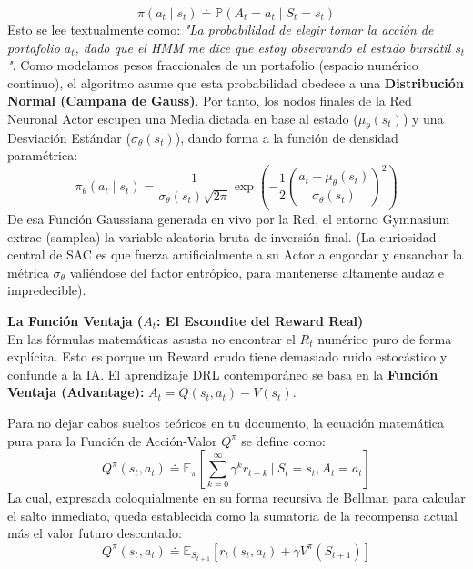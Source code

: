 \documentclass[11pt]{article}
\begin{document}
\begin{itemize}
    \begin{equation}
        \pi(a_t \mid s_t) \doteq \mathbb{P}(A_t = a_t \mid S_t = s_t)
    \end{equation}
    Esto se lee textualmente como: \textit{"La probabilidad de elegir tomar la acción de portafolio $a_t$, dado que el HMM me dice que estoy observando el estado bursátil $s_t$"}. Como modelamos pesos fraccionales de un portafolio (espacio numérico continuo), el algoritmo asume que esta probabilidad obedece a una \textbf{Distribución Normal (Campana de Gauss)}. Por tanto, los nodos finales de la Red Neuronal Actor escupen una Media dictada en base al estado ($\mu_\theta(s_t)$) y una Desviación Estándar ($\sigma_\theta(s_t)$), dando forma a la función de densidad paramétrica:
    \begin{equation}
        \pi_\theta(a_t \mid s_t) = \frac{1}{\sigma_\theta(s_t) \sqrt{2\pi}} \exp\left( -\frac{1}{2} \left(\frac{a_t - \mu_\theta(s_t)}{\sigma_\theta(s_t)}\right)^2 \right)
    \end{equation}
    De esa Función Gaussiana generada en vivo por la Red, el entorno Gymnasium extrae (samplea) la variable aleatoria bruta de inversión final. (La curiosidad central de SAC es que fuerza artificialmente a su Actor a engordar y ensanchar la métrica $\sigma_\theta$ valiéndose del factor entrópico, para mantenerse altamente audaz e impredecible).
\end{itemize}

\vspace{1mm}
\noindent\textbf{La Función Ventaja ($A_t$: El Escondite del Reward Real)} \\
En las fórmulas matemáticas asusta no encontrar el $R_t$ numérico puro de forma explícita. Esto es porque un Reward crudo tiene demasiado ruido estocástico y confunde a la IA. El aprendizaje DRL contemporáneo se basa en la \textbf{Función Ventaja (Advantage):} $A_t = Q(s_t, a_t) - V(s_t)$. 

Para no dejar cabos sueltos teóricos en tu documento, la ecuación matemática pura para la Función de Acción-Valor $Q^\pi$ se define como:
\begin{equation}
    Q^\pi(s_t, a_t) \doteq \mathbb{E}_{\pi} \left[ \sum_{k=0}^{\infty} \gamma^k r_{t+k} \ \Bigg| \ S_t = s_t, A_t = a_t \right]
\end{equation}
La cual, expresada coloquialmente en su forma recursiva de Bellman para calcular el salto inmediato, queda establecida como la sumatoria de la recompensa actual más el valor futuro descontado:
\begin{equation}
    Q^\pi(s_t, a_t) \doteq \mathbb{E}_{S_{t+1}} \left[ r_t(s_t, a_t) + \gamma V^\pi(S_{t+1}) \right]
\end{equation}
\end{document}
